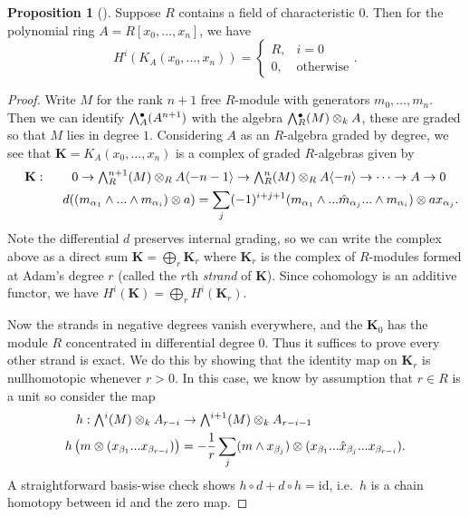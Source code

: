 \documentclass[a4paper]{article}
\theoremstyle{definition}
\newtheorem{prop}[defn]{Proposition}
\theoremstyle{remark}
\newcommand{\Exter}{\mathchoice{{\textstyle\bigwedge}}%
    {{\bigwedge}}%
    {{\textstyle\wedge}}%
    {{\scriptstyle\wedge}}}
\begin{document}
\begin{prop}[]\label{prop-koszulcomplex-exactness}
    Suppose \(R\) contains a field of characteristic \(0\). Then
    for the polynomial ring \(A=R[x_0,...,x_n]\), we have 
    \[H^i(K_A(x_0,...,x_n)) = \begin{cases}
        R, &i=0\\
        0, &\text{otherwise}
    \end{cases}.\]

    \begin{proof} 
        Write \(M\) for the rank \(n+1\) free \(R\)-module with generators
        \(m_0,...,m_n\). Then we can identify \(\Exter_A^\bullet(A^{n+1})\) with
        the algebra \(\Exter^\bullet_R(M)\otimes_k A\), these are graded so that
        \(M\) lies in degree \(1\). Considering \(A\) as an \(R\)-algebra graded
        by degree, we see that \(\mathbf{K}=K_A(x_0,...,x_n)\) is a complex of
        graded \(R\)-algebras given by 
        \begin{gather*} \label{k-koszul-strand}
            \mathbf{K}:\qquad 0\rightarrow \Exter^{n+1}_R(M)\otimes_R
            A\langle{-n-1}\rangle \rightarrow \Exter^n_R(M)\otimes_R
            A\langle{-n}\rangle \rightarrow \cdots \rightarrow A \rightarrow 0
            \\ 
            \qquad \qquad d ((m_{\alpha_1}\wedge...\wedge m_{\alpha_i})\otimes
            a) = \sum_j
            (-1)^{i+j+1}(m_{\alpha_1}\wedge...\hat{m}_{\alpha_j}...\wedge
            m_{\alpha_i}) \otimes ax_{\alpha_j}.
        \end{gather*} 
        Note the differential \(d\) preserves internal grading, so we can write the
        complex above as a direct sum \(\mathbf{K} = \bigoplus_r \mathbf{K}_r\)
        where \(\mathbf{K}_r\) is the complex of \(R\)-modules formed at
        Adam's degree \(r\) (called the \(r\)th \textit{strand} of
        \(\mathbf{K}\)). Since cohomology is an additive functor, we have
        \(H^i(\mathbf{K})=\bigoplus_r H^i(\mathbf{K}_r)\).

        Now the strands in negative degrees vanish everywhere, and the
        \(\mathbf{K}_0\) has the module \(R\) concentrated in differential degree
        \(0\).  Thus it suffices to prove every other strand is exact. We do
        this by showing that the identity map on \(\mathbf{K}_r\) is
        nullhomotopic whenever \(r > 0\). In this case, we know by assumption
        that \(r\in R\) is a unit so consider the map
        \begin{align*} 
            h: \Exter^i(M) \otimes_k A_{r-i} &\rightarrow
            \Exter^{i+1}(M) \otimes_k A_{r-i-1} \\
            h\left(m\otimes (x_{\beta_1}...x_{\beta_{r-i}})\right)&= -\frac{1}{r}
            \sum_{j}(m \wedge x_{\beta_j}) \otimes (x_{\beta_1}...
            \hat{x}_{\beta_j}...x_{\beta_{r-i}}).  
        \end{align*}
        A straightforward basis-wise check shows \(h\circ d + d\circ h =
        \text{id}\), i.e.\ \(h\) is a chain homotopy between \(\text{id}\)
        and the zero map.
    \end{proof}
\end{prop}
\end{document}
